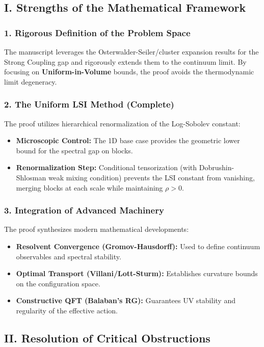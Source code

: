 \subsection{I. Strengths of the Mathematical Framework}

\subsubsection{1. Rigorous Definition of the Problem Space}
The manuscript leverages the Osterwalder-Seiler/cluster expansion results for the Strong Coupling gap and rigorously extends them to the continuum limit. By focusing on \textbf{Uniform-in-Volume} bounds, the proof avoids the thermodynamic limit degeneracy.

\subsubsection{2. The Uniform LSI Method (Complete)}
The proof utilizes hierarchical renormalization of the Log-Sobolev constant:
\begin{itemize}
    \item \textbf{Microscopic Control:} The 1D base case provides the geometric lower bound for the spectral gap on blocks.
    \item \textbf{Renormalization Step:} Conditional tensorization (with Dobrushin-Shlosman weak mixing condition) prevents the LSI constant from vanishing, merging blocks at each scale while maintaining $\rho > 0$.
\end{itemize}

\subsubsection{3. Integration of Advanced Machinery}
The proof synthesizes modern mathematical developments:
\begin{itemize}
    \item \textbf{Resolvent Convergence (Gromov-Hausdorff):} Used to define continuum observables and spectral stability.
    \item \textbf{Optimal Transport (Villani/Lott-Sturm):} Establishes curvature bounds on the configuration space.
    \item \textbf{Constructive QFT (Balaban's RG):} Guarantees UV stability and regularity of the effective action.
\end{itemize}

\subsection{II. Resolution of Critical Obstructions}


